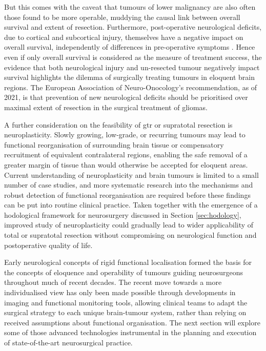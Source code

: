 But this comes with the caveat that tumours of lower malignancy are also often those found to be more operable, muddying the causal link between overall survival and extent of resection\autocite{Weller2021}.
Furthermore, post-operative neurological deficits, due to cortical and subcortical injury, themselves have a negative impact on overall survival, independently of differences in pre-operative symptoms \autocite{Trinh2013,Rahman2016,Rincon-Torroella2019}.
Hence even if only overall survival is considered as the measure of treatment success, the evidence that both neurological injury and un-resected tumour negatively impact survival highlights the dilemma of surgically treating tumours in eloquent brain regions\autocite{Rincon-Torroella2019,Duffau2004,Rahman2016}.
The European Association of Neuro-Onocology's recommendation, as of 2021, is that prevention of new neurological deficits should be prioritised over maximal extent of resection in the surgical treatment of gliomas\autocite{Weller2021}.

A further consideration on the feasibility of \gls{gtr} or supratotal resection is neuroplasticity\autocite{Duffau2005}.
Slowly growing, low-grade, or recurring tumours may lead to functional reorganisation of surrounding brain tissue\autocite{Takahashi2012,Southwell2016,Das2019} or compensatory recruitment of equivalent contralateral regions\autocite{Mitolo2022}, enabling the safe removal of a greater margin of tissue than would otherwise be accepted for eloquent areas\autocite{Rossi2019a}.
Current understanding of neuroplasticity and brain tumours is limited to a small number of case studies, and more systematic research into the mechanisms and robust detection of functional reorganisation are required before these findings can be put into routine clinical practice\autocite{Duffau2005,Abel2015,Satoer2017}.
Taken together with the emergence of a hodological framework for neurosurgery discussed in Section \ref{sec:hodology}\autocite{Sala2019}, improved study of neuroplasticity could gradually lead to wider applicability of total or supratotal resection without compromising on neurological function and postoperative quality of life.

Early neurological concepts of rigid functional localisation formed the basis for the concepts of eloquence and operability of tumours guiding neurosurgeons throughout much of recent decades.
The recent move towards a more individualised view has only been made possible through developments in imaging and functional monitoring tools, allowing clinical teams to adapt the surgical strategy to each unique brain-tumour system, rather than relying on received assumptions about functional organisation\autocite{Boerger2023}.
The next section will explore some of those advanced technologies instrumental in the planning and execution of state-of-the-art neurosurgical practice.

